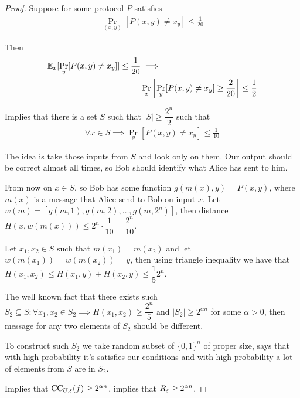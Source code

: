 \begin{proof}
	Suppose for some protocol $P$ satisfies
	\begin{align*}
		\Pr_{(x, y)}[P(x, y) \neq x_y] \leq \frac 1 {20}
	\end{align*}
	
	Then
	\begin{align*}
		\mathbb{E}_x[\Pr_y[P(x, y) \neq x_y]] \leq \frac 1 {20} &\implies \\
&\Pr_x\left[\Pr_y[P(x, y) \neq x_y] \geq \frac 2 {20}\right] \leq \frac 1 2
	\end{align*}
	
	Implies that there is a set $S$ such that $|S| \geq \dfrac {2^n} 2$ such that
	\begin{align*}
		\forall x \in S \implies \Pr_y[P(x, y) \neq x_y] \leq \frac 1 {10}
	\end{align*}
	
	The idea is take those inputs from $S$ and look only on them.
	Our output should be correct almost all times, so Bob should identify what Alice has sent to him.
	
	From now on $x \in S$, so Bob has some function $g(m(x), y) = P(x, y)$, where $m(x)$ is a message that Alice send to Bob on input $x$.
	Let $w(m) = [g(m, 1), g(m, 2), \dots, g(m, 2^n)]$, then distance $H(x, w(m(x))) \leq 2^n \cdot \dfrac 1 {10} = \dfrac {2^n} {10}$.
	
	Let $x_1, x_2 \in S$ such that $m(x_1) = m(x_2)$ and let $w(m(x_1)) = w(m(x_2) ) = y$, then using triangle inequality we have that $H(x_1, x_2) \leq H(x_1, y) + H(x_2, y) \leq \dfrac 1 5 2^n$.
	
	The well known fact that there exists such $S_2 \subseteq S \colon \forall x_1, x_2 \in S_2 \implies H(x_1, x_2) \geq \dfrac {2^n} 5$ and $|S_2| \geq 2^{\alpha n}$ for some $\alpha > 0$, then message for any two elements of $S_2$ should be different.
	
	To construct such $S_2$ we take random subset of $\{0, 1\}^n$ of proper size, says that with high probability it's satisfies our conditions and with high probability a lot of elements from $S$ are in $S_2$.
	
	Implies that $\operatorname{CC}_{U, \varepsilon} (f) \geq 2^{\alpha n}$, implies that $R_\varepsilon \geq 2^{\alpha n}$.
\end{proof}


